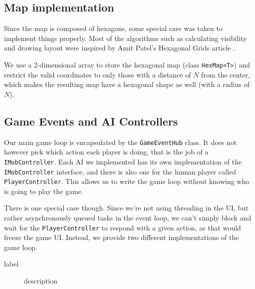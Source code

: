 \subsection{Map implementation}

Since the map is composed of hexagons, some special care was taken to implement things properly. Most of the algorithms such as calculating visibility and drawing layout were inspired by Amit Patel's Hexagonal Grids article \citep{hexagons}.

We use a 2-dimensional array to store the hexagonal map (class \verb|HexMap<T>|) and restrict the valid coordinates to only those with a distance of $N$ from the center, which makes the resulting map have a hexagonal shape as well (with a radius of $N$).

\subsection{Game Events and AI Controllers}

Our main game loop is encapsulated by the \verb|GameEventHub| class. It does not however pick which action each player is doing, that is the job of a \verb|IMobController|. Each AI we implemented has its own implementation of the \verb|IMobController| interface, and there is also one for the human player called \verb|PlayerController|. This allows us to write the game loop without knowing who is going to play the game.

There is one special case though. Since we're not using threading in the UI, but rather asynchronously queued tasks in the event loop, we can't simply block and wait for the \verb|PlayerController| to respond with a given action, as that would freeze the game UI. Instead, we provide two different implementations of the game loop.

\begin{description}
	\item[label] description
\end{description}